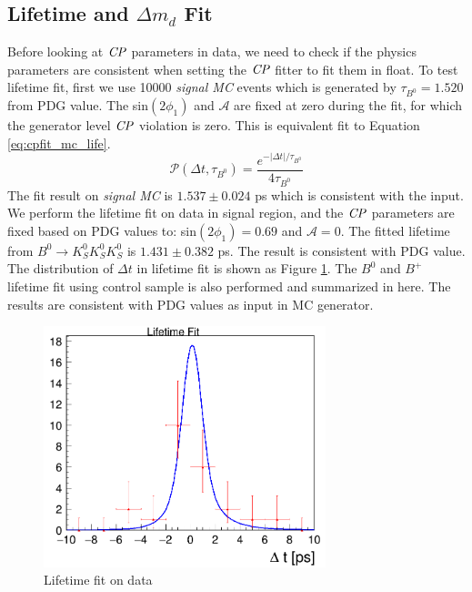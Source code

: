 \subsection{Lifetime and $\Delta m_d$ Fit}
Before looking at $\it{CP}$ parameters in data, we need to check if the physics parameters are consistent when setting the $\it{CP}$ fitter to fit them in float. To test lifetime fit, first we use 10000 \textit{signal MC} events which is generated by $\tau_{B^0} = 1.520$ from PDG value. The sin$(2\phi_1)$ and $\mathcal{A}$ are fixed at zero during the fit, for which the generator level $\it{CP}$ violation is zero. This is equivalent fit to Equation \ref{eq:cpfit_mc_life}.
\begin{equation}\label{eq:cpfit_mc_life}
\mathcal{P}(\Delta t,\tau_{B^0}) = 
\frac{e^{-|\Delta t|/\tau_{B^0}}}{4\tau_{B^0}}
\end{equation}
The fit result on \textit{signal MC} is $1.537 \pm 0.024$ ps which is consistent with the input. We perform the lifetime fit on data in signal region, and the $\it{CP}$ parameters are fixed based on PDG values to: sin$(2\phi_1)=0.69$ and $\mathcal{A} = 0$. The fitted lifetime from $B^0 \to K_S^0  K_S^0  K_S^0$ is $1.431\pm 0.382$ ps. The result is consistent with PDG value. The distribution of $\Delta t$ in lifetime fit is shown as Figure \ref{fig:cpfit_data_life}.
The $B^0$ and $B^+$ lifetime fit using control sample is also performed and summarized in here\cite{jpsiks_ichep}. The results are consistent with PDG values as input in MC generator. 
\begin{figure}[H]
	\centering
	\includegraphics[height=7cm]{figures/lifetime_data}
	\caption{Lifetime fit on data}
	\label{fig:cpfit_data_life}
\end{figure}

